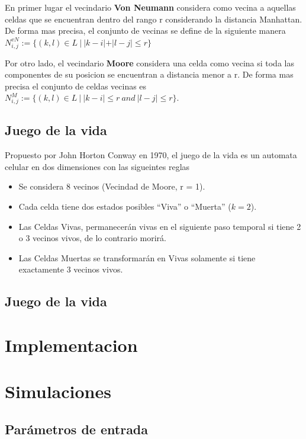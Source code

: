 \documentclass[11pt]{article}
\begin{document}
    En primer lugar el vecindario \textbf{Von Neumann} considera como vecina a aquellas celdas que se encuentran dentro del rango r
    considerando la distancia Manhattan. De forma mas precisa, el conjunto de vecinas se define de la siguiente manera
    $N_{i,j}^{vN}:=\{(k,l) \in L\ |\ |k-i|+ |l - j| \leq r\}$

    Por otro lado, el vecindario \textbf{Moore} considera una celda como vecina si toda las componentes de su posicion se encuentran
    a distancia menor a r. De forma mas precisa el conjunto de celdas vecinas es
    $N_{i,j}^{M}:=\{(k,l) \in L\ |\ |k-i|\leq r\ and\ |l - j| \leq r \}$.


    \subsection{Juego de la vida}
     Propuesto por John Horton Conway en 1970, el juego de la vida es un automata celular en dos dimensiones con las sigueintes reglas
    \begin{itemize}
        \item Se considera 8 vecinos (Vecindad de Moore, r = 1).
        \item Cada celda tiene dos estados posibles “Viva” o “Muerta” ($k=2$).
        \item Las Celdas Vivas, permanecerán vivas en el siguiente paso temporal si tiene 2 o 3 vecinos vivos, de lo contrario morirá.
        \item Las Celdas Muertas se transformarán en Vivas solamente si tiene exactamente 3 vecinos vivos.
    \end{itemize}

    \subsection{Juego de la vida}\label{subsec:juego-de-la-vida}



    \section{Implementacion}\label{sec:implementacion}


    \section{Simulaciones}\label{sec:simulaciones}

    \subsection{Parámetros de entrada}\label{subsec:parametros-de-entrada}
\end{document}
